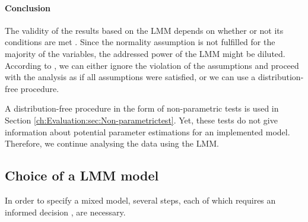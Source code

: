 \paragraph{Conclusion}
The validity of the results based on the \ac{LMM} depends on whether or not its conditions are met \citep{Siegel1957}. Since the normality assumption is not fulfilled for the majority of the variables, the addressed power of the \ac{LMM} might be diluted. According to \cite{Graybill1976}, we can either ignore the violation of the assumptions and proceed with the analysis as if all assumptions were satisfied, or we can use a distribution-free procedure.

A distribution-free procedure in the form of non-parametric tests is used in Section \ref{ch:Evaluation:sec:Non-parametrictest}. Yet, these tests do not give information about potential parameter estimations for an implemented model.
Therefore, we continue analysing the data using the \ac{LMM}.

\subsection{Choice of a \ac{LMM} model}
In order to specify a mixed model, several steps, each of which requires an informed decision \citep{Seltman2012}, are necessary. 

